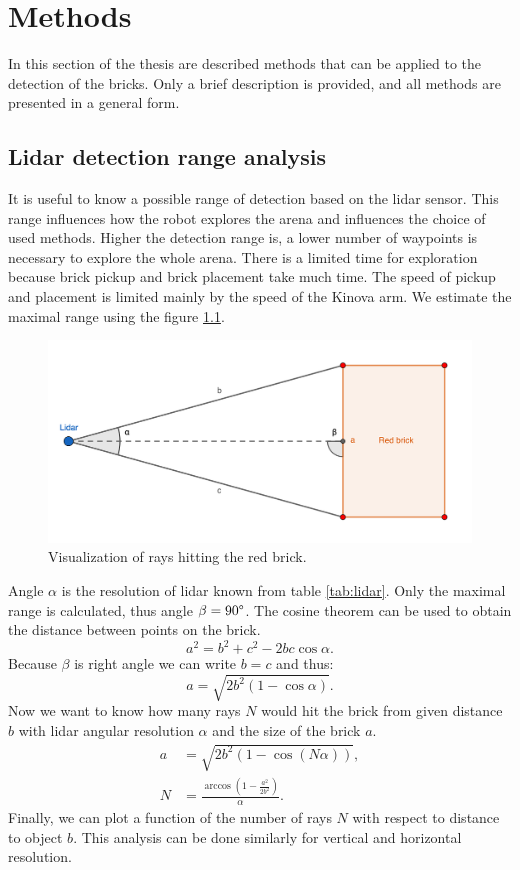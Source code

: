 \chapter{Methods}
In this section of the thesis are described methods that can be applied to the detection of the bricks. Only a brief description is provided, and all methods are presented in a general form.

\section{Lidar detection range analysis}
It is useful to know a possible range of detection based on the lidar sensor. This range influences how the robot explores the arena and influences the choice of used methods. Higher the detection range is, a lower number of waypoints is necessary to explore the whole arena. There is a limited time for exploration because brick pickup and brick placement take much time. The speed of pickup and placement is limited mainly by the speed of the Kinova arm. We estimate the maximal range using the figure \ref{fig:range}.

\begin{figure}[H]
	\centering
	\includegraphics[scale=1.1]{fig/lidar_range.png}
	\caption[Lidar range study]{Visualization of rays hitting the red brick.}
	\label{fig:range}
\end{figure}

Angle $\alpha$ is the resolution of lidar known from table \ref{tab:lidar}. Only the maximal range is calculated, thus angle $\beta = 90\degree$. The cosine theorem can be used to obtain the distance between points on the brick.
\begin{equation}
a^2 = b^2 + c^2 - 2bc \cos \alpha.
\end{equation}
Because $\beta$ is right angle we can write $b = c$ and thus:
\begin{equation}
a = \sqrt{2b^2 \left(1-\cos \alpha \right)}.
\end{equation}
Now we want to know how many rays $N$ would hit the brick from given distance $b$ with lidar angular resolution $\alpha$ and the size of the brick $a$. 
\begin{align}
a &= \sqrt{2b^2 \left(1-\cos \left( N \alpha \right) \right)}, \\
N &= \frac{\arccos\left(1-\frac{a^2}{2b^2}\right) }{\alpha}.
\label{eq:rays}
\end{align}
Finally, we can plot a function of the number of rays $N$ with respect to distance to object $b$. This analysis can be done similarly for vertical and horizontal resolution.

